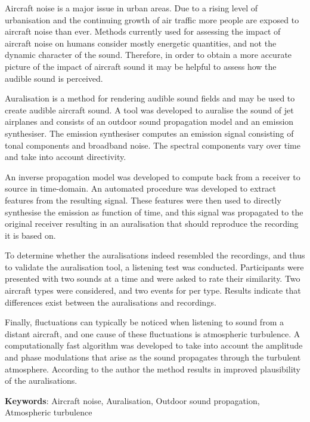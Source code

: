 Aircraft noise is a major issue in urban areas. Due to a rising level of
urbanisation and the continuing growth of air traffic more people are exposed to
aircraft noise than ever. Methods currently used for assessing the
impact of aircraft noise on humans consider mostly energetic quantities, and not the
dynamic character of the sound. Therefore, in order to obtain a more accurate
picture of the impact of aircraft sound it may be helpful to assess how the audible
sound is perceived.

Auralisation is a method for rendering audible sound fields and may be used to
create audible aircraft sound. A tool was developed to auralise the sound of jet
airplanes and consists of an outdoor sound propagation model and an emission synthesiser.
The emission synthesiser computes an emission signal consisting of tonal
components and broadband noise. The spectral components vary over time and take
into account directivity.

An inverse propagation model was developed to compute back from a receiver to
source in time-domain. An automated procedure was developed to extract features
from the resulting signal. These features were then used to directly synthesise
the emission as function of time, and this signal was propagated to the original
receiver resulting in an auralisation that should reproduce the recording
it is based on.

To determine whether the auralisations indeed resembled the recordings, and thus
to validate the auralisation tool, a listening test was conducted. Participants
were presented with two sounds at a time and were asked to rate their similarity.
Two aircraft types were considered, and two events for per type.
Results indicate that differences exist between the auralisations and recordings.

Finally, fluctuations can typically be noticed when listening to sound from a
distant aircraft, and one cause of these fluctuations is atmospheric turbulence.
A computationally fast algorithm was developed to take into account the
amplitude and phase modulations that arise as the sound propagates through the
turbulent atmosphere. According to the author the method results in improved
plausibility of the auralisations.



\vspace{0.1cm}

\textbf{Keywords}: Aircraft noise, Auralisation, Outdoor sound propagation, Atmospheric turbulence
